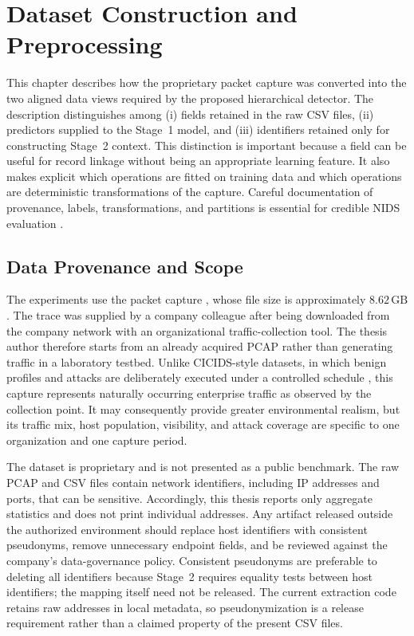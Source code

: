 \documentclass[11pt,fleqn]{report}
\begin{document}
\providecommand{\datasetfield}[1]{\texttt{\detokenize{#1}}}


\chapter{Dataset Construction and Preprocessing}
\label{sec:dataset_preprocessing}

This chapter describes how the proprietary packet capture was converted into
the two aligned data views required by the proposed hierarchical detector. The
description distinguishes among (i) fields retained in the raw CSV files,
(ii) predictors supplied to the Stage~1 model, and (iii) identifiers retained
only for constructing Stage~2 context. This distinction is important because a
field can be useful for record linkage without being an appropriate learning
feature. It also makes explicit which operations are fitted on training data
and which operations are deterministic transformations of the capture.
Careful documentation of provenance, labels, transformations, and partitions
is essential for credible NIDS evaluation
\cite{Shiravi2012DatasetGeneration,Ring2019Datasets,Goldschmidt2025Datasets,
Pinto2025DatasetReview}.

\section{Data Provenance and Scope}
\label{subsec:data_provenance}

The experiments use the packet capture
\datasetfield{ar002_et12_20260511_001.pcap}, whose file size is approximately
$8.62\,\mathrm{GB}$. The trace was supplied by a company colleague after being
downloaded from the company network with an organizational traffic-collection
tool. The thesis author therefore starts from an already acquired PCAP rather
than generating traffic in a laboratory testbed. Unlike CICIDS-style datasets,
in which benign profiles and attacks are deliberately executed under a
controlled schedule \cite{Sharafaldin2018CICIDS}, this capture represents
naturally occurring enterprise traffic as observed by the collection point.
It may consequently provide greater environmental realism, but its traffic
mix, host population, visibility, and attack coverage are specific to one
organization and one capture period.

The dataset is proprietary and is not presented as a public benchmark. The raw
PCAP and CSV files contain network identifiers, including IP addresses and
ports, that can be sensitive. Accordingly, this thesis reports only aggregate
statistics and does not print individual addresses. Any artifact released
outside the authorized environment should replace host identifiers with
consistent pseudonyms, remove unnecessary endpoint fields, and be reviewed
against the company's data-governance policy. Consistent pseudonyms are
preferable to deleting all identifiers because Stage~2 requires equality tests
between host identifiers; the mapping itself need not be released. The current
extraction code retains raw addresses in local metadata, so pseudonymization is
a release requirement rather than a claimed property of the present CSV files.
\end{document}
